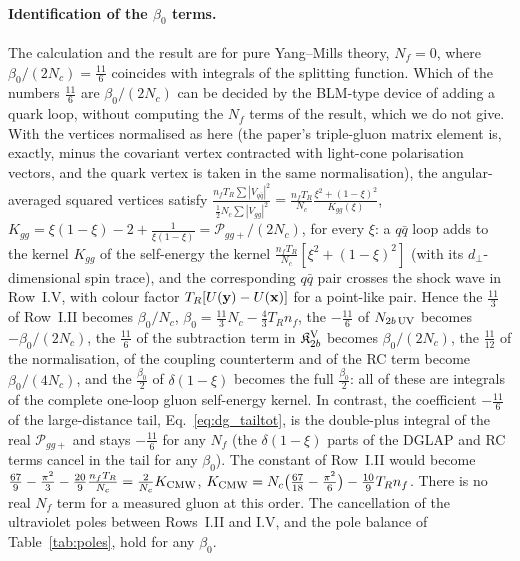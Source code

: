 \paragraph{Identification of the $\beta_0$ terms.} The calculation and the result are for pure Yang--Mills theory, $N_f=0$, where $\beta_0/(2N_c)=\frac{11}{6}$ coincides with integrals of the splitting function. Which of the numbers $\frac{11}{6}$ are $\beta_0/(2N_c)$ can be decided by the BLM-type device of adding a quark loop, without computing the $N_f$ terms of the result, which we do not give. With the vertices normalised as here (the paper's triple-gluon matrix element is, exactly, minus the covariant vertex contracted with light-cone polarisation vectors, and the quark vertex is taken in the same normalisation), the angular-averaged squared vertices satisfy $\frac{n_fT_R\sum|V_{q\bar q}|^2}{\frac12N_c\sum|V_{gg}|^2}=\frac{n_fT_R}{N_c}\frac{\xi^2+(1-\xi)^2}{K_{gg}(\xi)}$, $K_{gg}=\xi(1-\xi)-2+\frac{1}{\xi(1-\xi)}=\mathcal P_{gg+}/(2N_c)$, for every $\xi$: a $q\bar q$ loop adds to the kernel $K_{gg}$ of the self-energy the kernel $\frac{n_fT_R}{N_c}[\xi^2+(1-\xi)^2]$ (with its $d_\perp$-dimensional spin trace), and the corresponding $q\bar q$ pair crosses the shock wave in Row~I.V, with colour factor $T_R[U(\mathbf{y})-U(\mathbf{x})]$ for a point-like pair. Hence the $\frac{11}{3}$ of Row~I.II becomes $\beta_0/N_c$, $\beta_0=\frac{11}{3}N_c-\frac43T_Rn_f$, the $-\frac{11}{6}$ of $N_{2b\,\rm UV}$ becomes $-\beta_0/(2N_c)$, the $\frac{11}{6}$ of the subtraction term in $\mathfrak K^{\rm V}_{2b}$ becomes $\beta_0/(2N_c)$, the $\frac{11}{12}$ of the normalisation, of the coupling counterterm and of the RC term become $\beta_0/(4N_c)$, and the $\frac{\beta_0}{2}$ of $\delta(1-\xi)$ becomes the full $\frac{\beta_0}{2}$: all of these are integrals of the complete one-loop gluon self-energy kernel. In contrast, the coefficient $-\frac{11}{6}$ of the large-distance tail, Eq.~\eqref{eq:dg_tailtot}, is the double-plus integral of the real $\mathcal P_{gg+}$ and stays $-\frac{11}{6}$ for any $N_f$ (the $\delta(1-\xi)$ parts of the DGLAP and RC terms cancel in the tail for any $\beta_0$). The constant of Row~I.II would become $\frac{67}{9}-\frac{\pi^2}{3}-\frac{20}{9}\frac{n_fT_R}{N_c}=\frac{2}{N_c}K_{\rm CMW}$, $K_{\rm CMW}=N_c\big(\frac{67}{18}-\frac{\pi^2}{6}\big)-\frac{10}{9}T_Rn_f$. There is no real $N_f$ term for a measured gluon at this order. The cancellation of the ultraviolet poles between Rows~I.II and I.V, and the pole balance of Table~\ref{tab:poles}, hold for any $\beta_0$.

